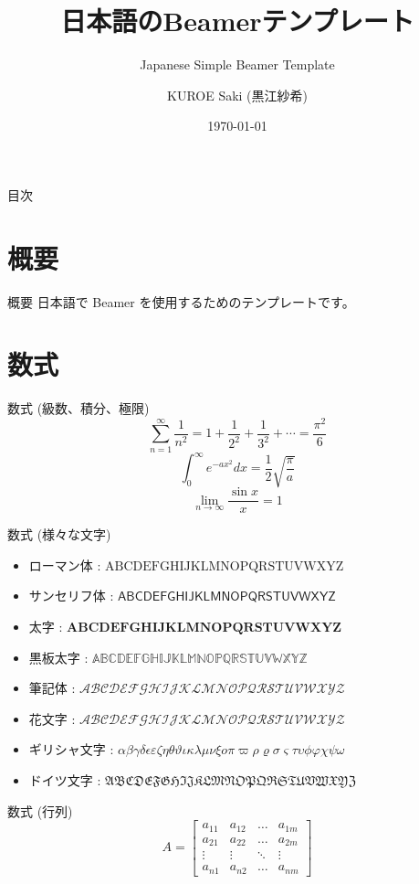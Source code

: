 \documentclass[aspectratio=169]{beamer}
\title[short title]{日本語のBeamerテンプレート}
\subtitle{Japanese Simple Beamer Template}
\author[sakikuroe]{KUROE Saki (黒江紗希)}
\institute[Hoge大]{Hogehoge University}
\date{\today}
\begin{document}
\begin{frame}
    \titlepage
\end{frame}

\begin{frame}{目次}
    \tableofcontents
\end{frame}

\section{概要}
\begin{frame}{概要}
    日本語で Beamer を使用するためのテンプレートです。
\end{frame}

\section{数式}
\begin{frame}{数式 (級数、積分、極限)}
    $$\sum_{n=1}^{\infty} \frac{1}{n^{2}} = 1 + \frac{1}{2^{2}} + \frac{1}{3^{2}} + \cdots = \frac{\pi^{2}}{6}$$
    $$\int_{0}^{\infty}e^{-ax^{2}}dx=\frac{1}{2}\sqrt{\frac{\pi}{a}}$$
    $$\lim_{n\rightarrow\infty}\frac{\sin x}{x}=1$$
\end{frame}

\begin{frame}{数式 (様々な文字)}
    \begin{itemize}
        \item ローマン体 : $\mathrm{ABCDEFGHIJKLMNOPQRSTUVWXYZ}$
        \item サンセリフ体 : $\mathsf{ABCDEFGHIJKLMNOPQRSTUVWXYZ}$
        \item 太字 : $\bm{ABCDEFGHIJKLMNOPQRSTUVWXYZ}$
        \item 黒板太字 : $\mathbb{ABCDEFGHIJKLMNOPQRSTUVWXYZ}$
        \item 筆記体 : $\mathcal{ABCDEFGHIJKLMNOPQRSTUVWXYZ}$
        \item 花文字 : $\mathscr{ABCDEFGHIJKLMNOPQRSTUVWXYZ}$
        \item ギリシャ文字 : $\alpha\beta\gamma\delta\epsilon\varepsilon\zeta\eta\theta\vartheta\iota\kappa\lambda\mu\nu\xi o\pi\varpi\rho\varrho\sigma\varsigma\tau\upsilon\phi\varphi\chi\psi\omega$
        \item ドイツ文字 : $\mathfrak{ABCDEFGHIJKLMNOPQRSTUVWXYZ}$
    \end{itemize}
\end{frame}

\begin{frame}{数式 (行列)}
    $$
        A
        =
        \begin{bmatrix}
            a_{11} & a_{12} & \dots  & a_{1m} \\
            a_{21} & a_{22} & \dots  & a_{2m} \\
            \vdots & \vdots & \ddots & \vdots \\
            a_{n1} & a_{n2} & \dots  & a_{nm}
        \end{bmatrix}
    $$
\end{frame}
\end{document}
